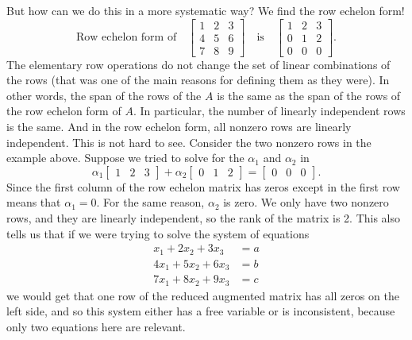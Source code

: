 But how can we do this in a more systematic way?  We find the row echelon
form!
\begin{equation*}
\text{Row echelon form of}
\quad
\begin{bmatrix}
1 & 2 & 3 \\
4 & 5 & 6  \\
7 & 8 & 9
\end{bmatrix}
\quad
\text{is}
\quad
\begin{bmatrix}
1 & 2 & 3 \\
0 & 1 & 2  \\
0 & 0 & 0
\end{bmatrix} .
\end{equation*}
The elementary row operations do not change the set of linear combinations of
the rows (that was one of the main reasons for defining them as they were).
In other words, the span of the rows of the $A$ is the same
as the span of the rows of the row echelon form of $A$.
In particular, the number of linearly independent rows is the same.
And in the row echelon form, all nonzero rows are linearly independent.
This is not hard to see.
Consider the two nonzero rows in the example above.
Suppose we 
tried to solve for the $\alpha_1$ and $\alpha_2$
in
\begin{equation*}
\alpha_1
\begin{bmatrix}
1 & 2 & 3
\end{bmatrix} 
+
\alpha_2
\begin{bmatrix}
0 & 1 & 2 
\end{bmatrix} =
\begin{bmatrix}
0 & 0 & 0
\end{bmatrix} .
\end{equation*}
Since the first column
of the row echelon matrix has zeros except in the first row means that
$\alpha_1 = 0$.  For the same reason, $\alpha_2$ is zero.
We only have two nonzero rows,
and they are linearly independent, so the rank of the matrix is 2. This also tells us that if we were trying to solve the system of equations
\begin{equation*}
\begin{split}
x_1 + 2x_2 + 3x_3 &= a \\
4x_1 + 5x_2 + 6x_3 &= b \\
7x_1 + 8x_2 + 9x_3 &= c
\end{split}
\end{equation*}
we would get that one row of the reduced augmented matrix has all zeros on the left side, and so this system either has a free variable or is inconsistent, because only two equations here are relevant. 

